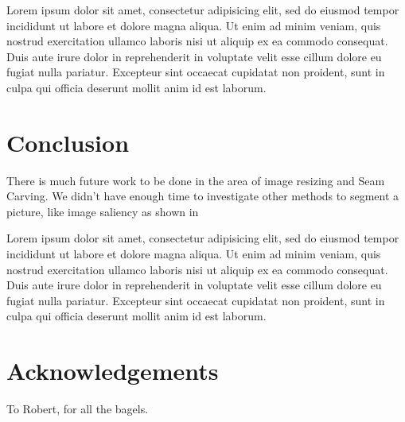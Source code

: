 \documentclass[conference]{acmsiggraph}
\begin{document}
Lorem ipsum dolor sit amet, consectetur adipisicing elit, sed do
eiusmod tempor incididunt ut labore et dolore magna aliqua. Ut enim ad
minim veniam, quis nostrud exercitation ullamco laboris nisi ut
aliquip ex ea commodo consequat. Duis aute irure dolor in
reprehenderit in voluptate velit esse cillum dolore eu fugiat nulla
pariatur. Excepteur sint occaecat cupidatat non proident, sunt in
culpa qui officia deserunt mollit anim id est laborum.

\section{Conclusion}

There is much future work to be done in the area of image resizing and Seam Carving. We didn't have enough time to investigate other methods to segment a picture, like image saliency as shown in  

Lorem ipsum dolor sit amet, consectetur adipisicing elit, sed do
eiusmod tempor incididunt ut labore et dolore magna aliqua. Ut enim ad
minim veniam, quis nostrud exercitation ullamco laboris nisi ut
aliquip ex ea commodo consequat. Duis aute irure dolor in
reprehenderit in voluptate velit esse cillum dolore eu fugiat nulla
pariatur. Excepteur sint occaecat cupidatat non proident, sunt in
culpa qui officia deserunt mollit anim id est laborum.

\section*{Acknowledgements}

To Robert, for all the bagels.



\end{document}
